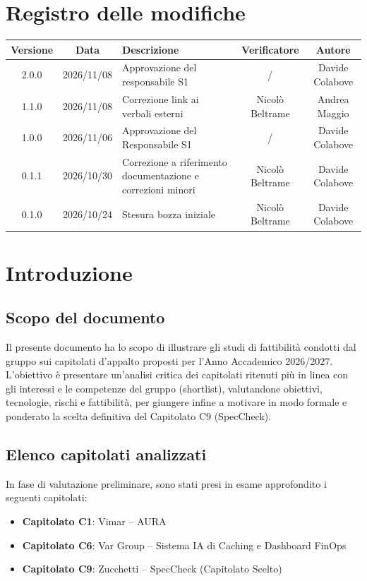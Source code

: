 \documentclass[a4paper, 11pt]{article}
\begin{document}
\section*{Registro delle modifiche}
{\renewcommand{\arraystretch}{1.5}
\begin{tabularx}{\textwidth}{|c|c|X|c|c|}
    \hline
    \textbf{Versione} & \textbf{Data} & \textbf{Descrizione} & \textbf{Verificatore} & \textbf{Autore} \\ \hline
    2.0.0 & 2026/11/08 & Approvazione del responsabile S1 & / & Davide Colabove \\ \hline
    1.1.0 & 2026/11/08 & Correzione link ai verbali esterni & Nicolò Beltrame & Andrea Maggio \\ \hline
    1.0.0 & 2026/11/06 & Approvazione del Responsabile S1 & / & Davide Colabove\\ \hline
    0.1.1 & 2026/10/30 & Correzione a riferimento documentazione e correzioni minori & Nicolò Beltrame & Davide Colabove\\ \hline
    0.1.0 & 2026/10/24 & Stesura bozza iniziale & Nicolò Beltrame & Davide Colabove\\ \hline
\end{tabularx}}

\newpage
\tableofcontents
\newpage

\section{Introduzione}

\subsection{Scopo del documento}
Il presente documento ha lo scopo di illustrare gli studi di fattibilità condotti dal gruppo sui capitolati d'appalto proposti per l'Anno Accademico 2026/2027. 
L'obiettivo è presentare un'analisi critica dei capitolati ritenuti più in linea con gli interessi e le competenze del gruppo (shortlist), valutandone obiettivi, tecnologie, rischi e fattibilità, per giungere infine a motivare in modo formale e ponderato la scelta definitiva del Capitolato C9 (SpecCheck).

\subsection{Elenco capitolati analizzati}
In fase di valutazione preliminare, sono stati presi in esame approfondito i seguenti capitolati:
\begin{itemize}[label=-]
    \item \textbf{Capitolato C1}: Vimar -- AURA
    \item \textbf{Capitolato C6}: Var Group -- Sistema IA di Caching e Dashboard FinOps
    \item \textbf{Capitolato C9}: Zucchetti -- SpecCheck (Capitolato Scelto)
\end{itemize}
\end{document}
